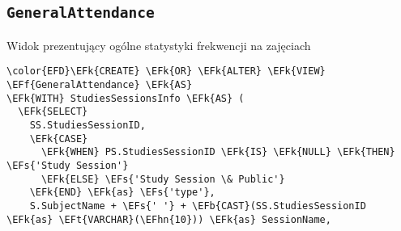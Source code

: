 \documentclass[11pt]{article}
\newcommand{\EFs}[1]{\textcolor{EFs}{#1}} %
\newcommand{\EFk}[1]{\textcolor{EFk}{\textbf{#1}}} %
\newcommand{\EFb}[1]{\textcolor{EFb}{\textbf{#1}}} %
\newcommand{\EFf}[1]{\textcolor{EFf}{#1}} %
\newcommand{\EFt}[1]{\textcolor{EFt}{\textbf{#1}}} %
\newcommand{\EFhn}[1]{\textcolor{EFhn}{#1}} %
\begin{document}
\subsection{\texttt{GeneralAttendance}}
\label{sec:org1fcea07}
Widok prezentujący ogólne statystyki frekwencji na zajęciach
\begin{Code}
\begin{Verbatim}
\color{EFD}\EFk{CREATE} \EFk{OR} \EFk{ALTER} \EFk{VIEW} \EFf{GeneralAttendance} \EFk{AS}
\EFk{WITH} StudiesSessionsInfo \EFk{AS} (
  \EFk{SELECT} 
    SS.StudiesSessionID, 
    \EFk{CASE}
      \EFk{WHEN} PS.StudiesSessionID \EFk{IS} \EFk{NULL} \EFk{THEN} \EFs{'Study Session'}
      \EFk{ELSE} \EFs{'Study Session \& Public'}
    \EFk{END} \EFk{as} \EFs{'type'},
    S.SubjectName + \EFs{' '} + \EFb{CAST}(SS.StudiesSessionID \EFk{as} \EFt{VARCHAR}(\EFhn{10})) \EFk{as} SessionName,


\end{Verbatim}
\end{Code}
\end{document}
